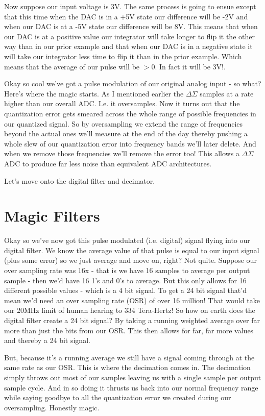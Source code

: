 \documentclass[10pt,a5paper]{book}
\begin{document}
Now suppose our input voltage is 3V. The same process is going to ensue except that this time when the DAC is in a +5V state our difference will be -2V and when our DAC is at a -5V state our difference will be 8V. This means that when our DAC is at a positive value our integrator will take longer to flip it the other way than in our prior example and that when our DAC is in a negative state it will take our integrator less time to flip it than in the prior example. Which means that the average of our pulse will be $>0$. In fact it will be 3V!. 

Okay so cool we've got a pulse modulation of our original analog input - so what? Here's where the magic starts. As I mentioned earlier the $\Delta \Sigma$ samples at a rate higher than our overall ADC. I.e. it oversamples. Now it turns out that the quantization error gets smeared across the whole range of possible frequencies in our quantized signal. So by oversampling we extend the range of frequencies beyond the actual ones we'll measure at the end of the day thereby pushing a whole slew of our quantization error into frequency bands we'll later delete. And when we remove those frequencies we'll remove the error too! This allows a $\Delta \Sigma$ ADC to produce far less noise than equivalent ADC architectures. 

Let's move onto the digital filter and decimator. 

\section{Magic Filters}
Okay so we've now got this pulse modulated (i.e. digital) signal flying into our digital filter. We know the average value of that pulse is equal to our input signal (plus some error) so we just average and move on, right? Not quite. Suppose our over sampling rate was 16x - that is we have 16 samples to average per output sample - then we'd have 16 1's and 0's to average. But this only allows for 16 different possible values - which is a 4 bit signal. To get a 24 bit signal that'd mean we'd need an over sampling rate (OSR) of over 16 million! That would take our 20MHz limit of human hearing to 334 Tera-Hertz! So how on earth does the digital filter create a 24 bit signal? By taking a running weighted average over far more than just the bits from our OSR. This then allows for far, far more values and thereby a 24 bit signal. 

But, because it's a running average we still have a signal coming through at the same rate as our OSR. This is where the decimation comes in. The decimation simply throws out most of our samples leaving us with a single sample per output sample cycle. And in so doing it thrusts us back into our normal frequency range while saying goodbye to all the quantization error we created during our oversampling. Honestly magic. 
\end{document}
